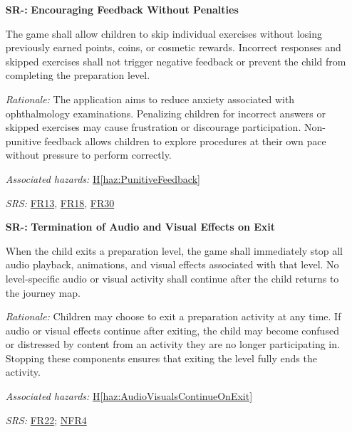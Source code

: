 \documentclass{article}
\newcounter{hazard}
\newcommand{\hazref}[1]{\hyperref[haz:#1]{H\ref*{haz:#1}}}
\newcounter{sr}
\newcommand{\srdef}[1]{\refstepcounter{sr}\label{sr:#1}\textbf{SR-\thesr:}}
\newcommand{\srsurl}{https://team-hindsight.github.io/ophthamology-game/SRS/SRS.pdf}
\newcommand{\srsfrref}[2]{\href{\srsurl\#nameddest=#1}{FR#2}}
\newcommand{\srsnfrref}[2]{\href{\srsurl\#nameddest=#1}{NFR#2}}
\begin{document}
\begin{itemize}[leftmargin=1.5cm, labelwidth=1.3cm, labelsep=0.2cm,
  align=left, itemsep=1.2em, parsep=0.6em]
\textit{Rationale:}
The procedures required during an ophthalmology
appointment may change unexpectedly. Restricting
access to later levels could prevent children from
preparing for an examination they may need.
Keeping all levels accessible allows children
to explore the procedures in any order.

\textit{Associated hazards:}
\hazref{RestrictedLevelAccess}

\textit{SRS:} \srsfrref{FR_StartLevel}{4}

\item[\srdef{NonPunitiveFeedback}]
\textbf{Encouraging Feedback Without Penalties}

The game shall allow children to skip individual
exercises without losing previously earned points,
coins, or cosmetic rewards. Incorrect responses
and skipped exercises shall not trigger negative
feedback or prevent the child from completing
the preparation level.

\textit{Rationale:}
The application aims to reduce anxiety associated
with ophthalmology examinations. Penalizing children
for incorrect answers or skipped exercises may
cause frustration or discourage participation.
Non-punitive feedback allows children to explore
procedures at their own pace without pressure
to perform correctly.

\textit{Associated hazards:}
\hazref{PunitiveFeedback}

\textit{SRS:} \srsfrref{FR_HintOnMiss}{13}, \srsfrref{FR_NoPenalty}{18}, \srsfrref{FR_FirstReward}{30}

\item[\srdef{StopAudioVisualsOnExit}]
\textbf{Termination of Audio and Visual Effects on Exit}

When the child exits a preparation level, the game
shall immediately stop all audio playback, animations,
and visual effects associated with that level.
No level-specific audio or visual activity shall
continue after the child returns to the journey map.

\textit{Rationale:}
Children may choose to exit a preparation activity
at any time. If audio or visual effects continue
after exiting, the child may become confused or
distressed by content from an activity they are
no longer participating in. Stopping these
components ensures that exiting the level
fully ends the activity.

\textit{Associated hazards:}
\hazref{AudioVisualsContinueOnExit}

\textit{SRS:} \srsfrref{FR_StopOnExit}{22}; \srsnfrref{NFR_Exit}{4}


\end{itemize}
\end{document}
